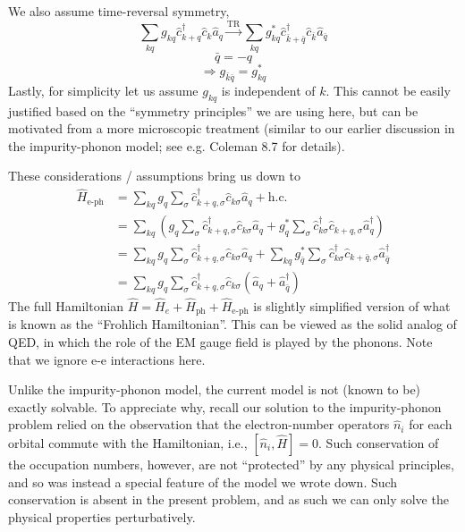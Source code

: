 We also assume time-reversal symmetry,
\[\sum_{kq}{g_{kq}\hat{c}_{k+q}^{\dagger}\hat{c}_k\hat{a}_q}\xrightarrow{\mathrm{TR}}\sum_{kq}{g_{kq}^{*}\hat{c}_{\bar{k}+\bar{q}}^{\dagger}\hat{c}_{\bar{k}}\hat{a}_{\bar{q}}}\]
\[ \bar{q}=-q\]
\[ \Rightarrow g_{\bar{k}\bar{q}}=g_{kq}^{*}\]
Lastly, for simplicity let us assume $g_{kq}$ is independent of $k$. This cannot be easily justified based on the ``symmetry principles'' we are using here, but can be motivated from a more microscopic treatment (similar to our earlier discussion in the impurity-phonon model; see e.g. Coleman 8.7 for details).

These considerations / assumptions bring us down to
\begin{align*}
    \hat{H}_{\text{e-ph}}&=\sum_{kq}{g_q\sum_{\sigma}{\hat{c}_{k+q,\sigma}^{\dagger}\hat{c}_{k\sigma}\hat{a}_q}}+\mathrm{h}.\mathrm{c}.\\
    &=\sum_{kq}{\left( g_q\sum_{\sigma}{\hat{c}_{k+q,\sigma}^{\dagger}\hat{c}_{k\sigma}\hat{a}_q}+g_{q}^{*}\sum_{\sigma}{\hat{c}_{k\sigma}^{\dagger}\hat{c}_{k+q,\sigma}\hat{a}_{q}^{\dagger}} \right)}\\
    &=\sum_{kq}{g_q\sum_{\sigma}{\hat{c}_{k+q,\sigma}^{\dagger}\hat{c}_{k\sigma}\hat{a}_q}}+\sum_{kq}{g_{\bar{q}}^{*}\sum_{\sigma}{\hat{c}_{k\sigma}^{\dagger}\hat{c}_{k+\bar{q},\sigma}\hat{a}_{\bar{q}}^{\dagger}}}\\
    &=\sum_{kq}{g_q\sum_{\sigma}{\hat{c}_{k+q,\sigma}^{\dagger}\hat{c}_{k\sigma}\left( \hat{a}_q+\hat{a}_{\bar{q}}^{\dagger} \right)}}
\end{align*}
The full Hamiltonian $\hat{H}=\hat{H}_e+\hat{H}_{\mathrm{ph}}+\hat{H}_{\text{e-ph}}$ is slightly simplified version of what is known as the ``Frohlich Hamiltonian''. This can be viewed as the solid analog of QED, in which the role of the EM gauge field is played by the phonons. Note that we ignore e-e interactions here.

Unlike the impurity-phonon model, the current model is not (known to be) exactly solvable. To appreciate why, recall our solution to the impurity-phonon problem relied on the observation that the electron-number operators $\hat{n}_i$ for each orbital commute with the Hamiltonian, i.e., $\left[ \hat{n}_i,\hat{H} \right] =0$. Such conservation of the occupation numbers, however, are not ``protected'' by any physical principles, and so was instead a special feature of the model we wrote down. Such conservation is absent in the present problem, and as such we can only solve the physical properties perturbatively.

